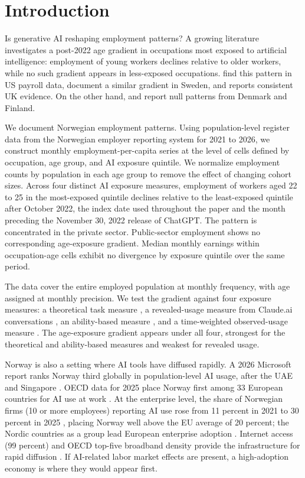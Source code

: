 \section{Introduction}
\label{sec:introduction}

Is generative AI reshaping employment patterns? A growing literature investigates a post-2022 age gradient in occupations most exposed to artificial intelligence: employment of young workers declines relative to older workers, while no such gradient appears in less-exposed occupations. \cite{brynjolfsson2025} find this pattern in US payroll data, \cite{lodefalk2026} document a similar gradient in Sweden, and \cite{teeselink2025} reports consistent UK evidence. On the other hand, \cite{humlum2026} and \cite{kauhanen2026} report null patterns from Denmark and Finland.

We document Norwegian employment patterns. Using population-level register data from the Norwegian employer reporting system for 2021 to 2026, we construct monthly employment-per-capita series at the level of cells defined by occupation, age group, and AI exposure quintile. We normalize employment counts by population in each age group to remove the effect of changing cohort sizes. Across four distinct AI exposure measures, employment of workers aged 22 to 25 in the most-exposed quintile declines relative to the least-exposed quintile after October 2022, the index date used throughout the paper and the month preceding the November 30, 2022 release of ChatGPT. The pattern is concentrated in the private sector. Public-sector employment shows no corresponding age-exposure gradient. Median monthly earnings within occupation-age cells exhibit no divergence by exposure quintile over the same period.

The data cover the entire employed population at monthly frequency, with age assigned at monthly precision. We test the gradient against four exposure measures: a theoretical task measure \citep{eloundou2024}, a revealed-usage measure from Claude.ai conversations \citep{handa2025}, an ability-based measure \citep{felten2021}, and a time-weighted observed-usage measure \citep{anthropic2026}. The age-exposure gradient appears under all four, strongest for the theoretical and ability-based measures and weakest for revealed usage.

Norway is also a setting where AI tools have diffused rapidly. A 2026 Microsoft report ranks Norway third globally in population-level AI usage, after the UAE and Singapore \citep{microsoft2026ai}. OECD data for 2025 place Norway first among 33 European countries for AI use at work \citep{oecd2026ai}. At the enterprise level, the share of Norwegian firms (10 or more employees) reporting AI use rose from 11 percent in 2021 to 30 percent in 2025 \citep{ssb2025ikt}, placing Norway well above the EU average of 20 percent; the Nordic countries as a group lead European enterprise adoption \citep{bick2026}. Internet access (99 percent) and OECD top-five broadband density provide the infrastructure for rapid diffusion \citep{oecd2024digitalnorway}. If AI-related labor market effects are present, a high-adoption economy is where they would appear first.
